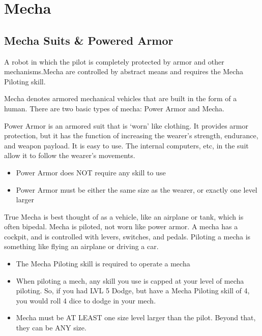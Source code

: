 \documentclass[twoside]{book}
\begin{document}
\begin{multicols}{2}
    
\end{multicols}
  
    

\chapter{Mecha}
    
    

\section{Mecha Suits \& Powered Armor}
    
    {  
      A robot in which the pilot is completely protected by
             armor and other mechanisms.Mecha are controlled by abstract
             means and requires the Mecha Piloting skill. 
    }
  
    {  
      Mecha denotes armored mechanical vehicles that are
             built in the form of a human. There are two basic types of
             mecha: Power Armor and Mecha. 
    }
  
    {  
      Power Armor is an armored suit that is
             `worn' like clothing. It provides armor
             protection, but it has the function of increasing the
             wearer's strength, endurance, and weapon payload. It
             is easy to use. The internal computers, etc, in the suit
             allow it to follow the wearer's movements. 
    }
  
\begin{itemize}
      
  \item  Power Armor does NOT require any skill to use
               
  \item  Power Armor must be either the same size as the
               wearer, or exactly one level larger 
\end{itemize}
  
    {  
      True Mecha is best thought of as a vehicle, like an
             airplane or tank, which is often bipedal. Mecha is piloted,
             not worn like power armor. A mecha has a cockpit, and is
             controlled with levers, switches, and pedals. Piloting a
             mecha is something like flying an airplane or driving a car.
             
    }
  
\begin{itemize}
      
  \item  The Mecha Piloting skill is required to operate a
               mecha 
  \item  When piloting a mech, any skill you use is capped at
               your level of mecha piloting. So, if you had LVL 5 Dodge,
               but have a Mecha Piloting skill of 4, you would roll 4
               dice to dodge in your mech. 
  \item  Mecha must be AT LEAST one size level larger than
               the pilot. Beyond that, they can be ANY size. 
\end{itemize}
  
\end{document}

